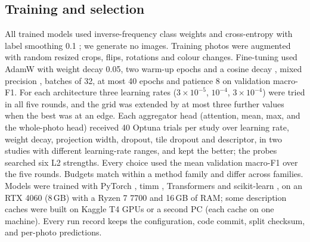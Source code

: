 \subsection{Training and selection}
\label{sec:setup:training}
All trained models used inverse-frequency class weights and cross-entropy with label smoothing 0.1
\cite{muller2019labelsmoothing}; we generate no images. Training photos were augmented with random resized crops, flips,
rotations and colour changes. Fine-tuning used AdamW \cite{loshchilov2019adamw} with weight decay 0.05, two warm-up epochs
and a cosine decay \cite{loshchilov2017sgdr}, mixed precision \cite{micikevicius2018mixed}, batches of 32, at most 40
epochs and patience 8 on validation macro-F1. For each architecture three learning rates ($3\times10^{-5}$, $10^{-4}$,
$3\times10^{-4}$) were tried in all five rounds, and the grid was extended by at most three further values when the best was
at an edge. Each aggregator head (attention, mean, max, and the whole-photo head) received 40 Optuna trials
\cite{akiba2019optuna} per study over learning rate, weight decay, projection width, dropout, tile dropout and descriptor,
in two studies with different learning-rate ranges, and kept the better; the probes searched six L2 strengths. Every
choice used the mean validation macro-F1 over the five rounds. Budgets match within a method family and differ across
families. Models were trained with PyTorch \cite{paszke2019pytorch}, timm \cite{wightman2019timm}, Transformers
\cite{wolf2020transformers} and scikit-learn \cite{pedregosa2011sklearn}, on an RTX 4060 (8\,GB) with a Ryzen 7 7700 and
16\,GB of RAM; some description caches were built on Kaggle T4 GPUs or a second PC (each cache on one machine). Every run
record keeps the configuration, code commit, split checksum, and per-photo predictions.

